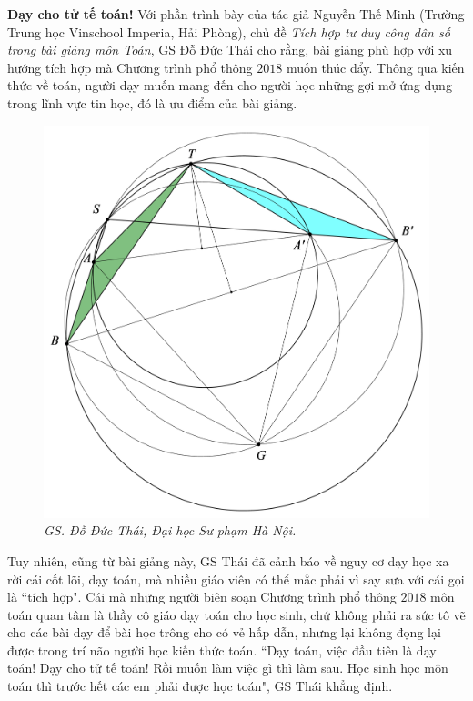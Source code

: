 \begin{multicols}{2}
	\vskip 0.1cm
	\textbf{\color{diendantoanhoc}Dạy cho tử tế toán!}
	\vskip 0.1cm
	Với phần trình bày của tác giả Nguyễn Thế Minh (Trường Trung học Vinschool Imperia, Hải Phòng), chủ đề \textit{Tích hợp tư duy công dân số trong bài giảng môn Toán}, GS Đỗ Đức Thái cho rằng, bài giảng phù hợp với xu hướng tích hợp mà Chương trình phổ thông $2018$ muốn thúc đẩy. Thông qua kiến thức về toán, người dạy muốn mang đến cho người học những gợi mở ứng dụng trong lĩnh vực tin học, đó là ưu điểm của bài giảng. 
	\begin{figure}[H]
		\vspace*{-5pt}
		\centering
		\captionsetup{labelformat= empty, justification=centering}
		\includegraphics[width= 1\linewidth]{1}
		\caption{\small\textit{\color{diendantoanhoc}GS. Đỗ Đức Thái, Đại học Sư phạm Hà Nội.}}
		\vspace*{-10pt}
	\end{figure}
	Tuy nhiên, cũng từ bài giảng này, GS Thái đã cảnh báo về nguy cơ dạy học xa rời cái cốt lõi, dạy toán, mà nhiều giáo viên có thể mắc phải vì say sưa với cái gọi là ``tích hợp". Cái mà những người biên soạn Chương trình phổ thông $2018$ môn toán quan tâm là thầy cô giáo dạy toán cho học sinh, chứ không phải ra sức tô vẽ cho các bài dạy để bài học trông cho có vẻ hấp dẫn, nhưng lại không đọng lại được trong trí não người học kiến thức toán. ``Dạy toán, việc đầu tiên là dạy toán! Dạy cho tử tế toán! Rồi muốn làm việc gì thì làm sau. Học sinh học môn toán thì trước hết các em phải được học toán", GS Thái khẳng định. 

\end{multicols}
